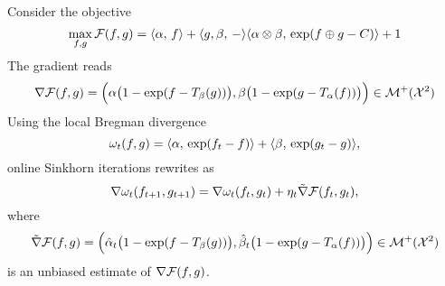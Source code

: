 \documentclass[a4paper, 10pt]{article}
\begin{document}
Consider the objective
\begin{equation}
    \max_{f, g} \mathcal{F}(f, g) = \langle \alpha,\,f\rangle + \langle g, \beta,\,-\rangle
     \langle \alpha \otimes \beta,\,\exp(f \oplus g - C)\rangle + 1
\end{equation}
The gradient reads
\begin{equation}
    \nabla \mathcal{F}(f, g) = \Big(\alpha\big(1 - \exp(f - T_\beta(g))\big), \beta\big(1 - \exp(g - T_\alpha(f))\big)\Big)
     \in \mathcal{M}^+(\mathcal{X}^2)
\end{equation}
Using the local Bregman divergence
\begin{equation}
    \omega_t(f, g) = \langle \alpha,\,\exp(f_t - f)\rangle + \langle \beta,\,\exp(g_t - g)\rangle,
\end{equation}
online Sinkhorn iterations rewrites as
\begin{equation}
    \nabla \omega_t(f_{t+1}, g_{t+1}) = \nabla \omega_t(f_t, g_t) + \eta_t \tilde \nabla \mathcal{F}(f_t, g_t),
\end{equation}
where 
\begin{equation}
    \tilde \nabla \mathcal{F}(f, g) = \Big(\hat \alpha_t \big(1 - \exp(f - T_\beta(g))\big), 
    \hat \beta_t \big(1 - \exp(g - T_\alpha(f))\big)\Big)
    \in \mathcal{M}^+(\mathcal{X}^2)
\end{equation}
is an unbiased estimate of $\nabla \mathcal{F}(f, g)$.
\printbibliography
\end{document}

